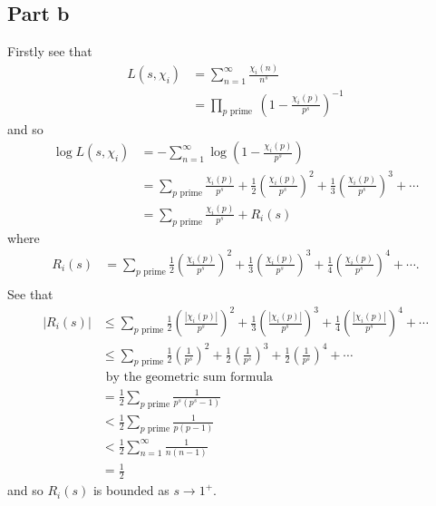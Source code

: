\documentclass{unswmaths}
\begin{document}
\subsection*{Part b}
Firstly see that 
\begin{align*}
	L(s, \chi_i) &= \sum_{n=1}^\infty \frac{\chi_i(n)}{n^s} \\
		&= \prod_{p \text{ prime }} \left( 1 - \frac{\chi_i(p)}{p^s} \right)^{-1}
\end{align*}
and so 
\begin{align*}
	\log L(s, \chi_i) &= - \sum_{n=1}^\infty \log \left( 1 - \frac{\chi_i(p)}{p^s} \right) \\
		&= \sum_{p \text{ prime}} \frac{\chi_i(p)}{p^s} + \frac{1}{2}\left( \frac{\chi_i(p)}{p^s} \right)^2 
			+ \frac{1}{3}\left( \frac{\chi_i(p)}{p^s} \right)^3 + \cdots \\
		&= \sum_{p \text{ prime}} \frac{\chi_i(p)}{p^s} + R_i(s)
\end{align*}
where
\begin{align*}
	R_i(s) &= \sum_{p \text{ prime}} \frac{1}{2}\left( \frac{\chi_i(p)}{p^s} \right)^2 + 
		\frac{1}{3}\left( \frac{\chi_i(p)}{p^s} \right)^3 + \frac{1}{4}\left( \frac{\chi_i(p)}{p^s} \right)^4 + \cdots. \\
\end{align*}
See that
\begin{align*}
	|R_i(s)| &\leq \sum_{p \text{ prime}} \frac{1}{2}\left( \frac{|\chi_i(p)|}{p^s} \right)^2 + 
		\frac{1}{3}\left( \frac{|\chi_i(p)|}{p^s} \right)^3 + \frac{1}{4}\left( \frac{|\chi_i(p)|}{p^s} \right)^4 + \cdots \\
		&\leq \sum_{p \text{ prime}} \frac{1}{2}\left( \frac{1}{p^s} \right)^2 + 
		\frac{1}{2}\left( \frac{1}{p^s} \right)^3 + \frac{1}{2}\left( \frac{1}{p^s} \right)^4 + \cdots \\
		& \text{ by the geometric sum formula } \\
		&= \frac{1}{2} \sum_{p \text{ prime}} \frac{1}{p^s(p^s-1)} \\
		&< \frac{1}{2} \sum_{p \text{ prime}} \frac{1}{p(p-1)} \\
		&< \frac{1}{2} \sum_{n=1}^\infty \frac{1}{n(n-1)} \\
		&= \frac{1}{2}
\end{align*}
and so $ R_i(s) $ is bounded as $ s \longrightarrow 1^{+} $.
\end{document}
